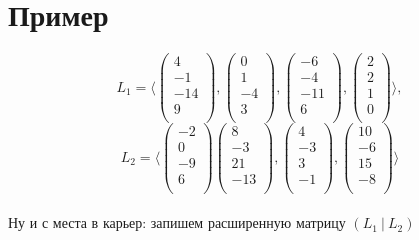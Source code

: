 \documentclass[a4paper,11pt]{report}
\begin{document}
\section{Пример}
\[L_1 = 
\langle
\begin{pmatrix}
4\\
-1\\
-14\\
9\\
\end{pmatrix},
\begin{pmatrix}
0\\
1\\
-4\\
3\\
\end{pmatrix},
\begin{pmatrix}
-6\\
-4\\
-11\\
6\\
\end{pmatrix},
\begin{pmatrix}
2\\
2\\
1\\
0\\
\end{pmatrix}
\rangle,
\]
\[
L_2 = 
\langle
\begin{pmatrix}
-2\\
0\\
-9\\
6\\
\end{pmatrix}
\begin{pmatrix}
8\\
-3\\
21\\
-13\\
\end{pmatrix},
\begin{pmatrix}
4\\
-3\\
3\\
-1\\
\end{pmatrix},
\begin{pmatrix}
10\\
-6\\
15\\
-8\\
\end{pmatrix}
\rangle\]\\
Ну и с места в карьер: запишем расширенную матрицу $(L_1\ |\ L_2)$\\
\end{document}

